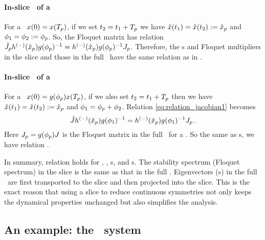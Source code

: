 \paragraph{In-slice \JacobianM\ of a \po}
For a \po\ $x(0)=x({T_{p}})$, if we
set $t_2 = t_1 + {T_{p}}$ we have
$\hat{x}(t_1)=\hat{x}(t_2) :=\hat{x}_p$ and
${\bf \phi}_{1}={\bf \phi}_{2} := {\bf \phi}_p$. So, the Floquet matrix
has relation
$\hat{J}_ph^{(-)}
(\hat{x}_p)g({\bf \phi}_p)^{-1}=
h^{(-)}(\hat{x}_p)g({\bf \phi}_p)^{-1}J_p$.
Therefore, the \Fv s and Floquet multipliers
in the slice and those in the full \statesp\
have the
same relation as in .

\paragraph{In-slice \JacobianM\ of a \rpo}
For a \rpo\
$x(0)=g({\bf \phi}_p)x({T_{p}})$, if we also
set $t_2 = t_1 + {T_{p}}$ then we have
$\hat{x}(t_1)=\hat{x}(t_2):=\hat{x}_p$ and
${\bf \phi}_1 = {\bf \phi}_p + {\bf \phi}_2$.
Relation \eqref{eq:relation_jacobian1} becomes
\begin{equation}
  \label{eq:Jrposlice}
  \hat{J} h^{(-)}
  (\hat{x}_p)g({\bf \phi}_{1})^{-1}
  = h^{(-)} (\hat{x}_p)g({\bf \phi}_{1})^{-1} J_p
  \,.
\end{equation}
Here $J_p = g({\bf \phi}_p) J$ is the Floquet matrix in the full
\statesp\ for a \rpo. So the same as \po s, we have relation .

In summary, relation \refeq{eq:Jeqv} holds for \eqva, \reqva, \po s, and
\rpo s. The stability spectrum (Floquet spectrum) in the slice is the
same as that in the full \statesp. Eigenvectors (\Fv s)
in the full \statesp\
are first transported to the slice and then projected into the slice.
This is the exact reason that using a slice to reduce continuous symmetries
not only keeps the dynamical properties unchanged but also
simplifies the analysis.

\subsection{An example: the \twomode\ system}

